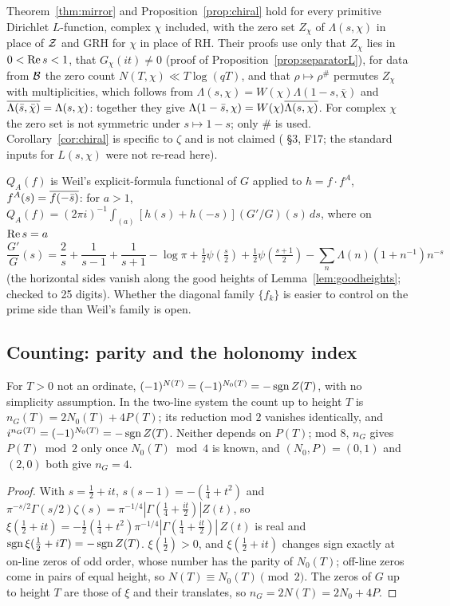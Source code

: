 Theorem~\ref{thm:mirror} and Proposition~\ref{prop:chiral} hold for every primitive Dirichlet $L$-function, complex $\chi$ included, with the zero set $Z_\chi$ of $\Lambda(s,\chi)$ in place of $\mathcal{Z}$ and GRH for $\chi$ in place of RH. Their proofs use only that $Z_\chi$ lies in $0<\operatorname{Re} s<1$, that $G_\chi(it)\ne0$ (proof of Proposition~\ref{prop:separatorL}), for data from $\mathcal{B}$ the zero count $N(T,\chi)\ll T\log(qT)$, and that $\rho\mapsto\rho^\#$ permutes $Z_\chi$ with multiplicities, which follows from $\Lambda(s,\chi)=W(\chi)\Lambda(1-s,\bar\chi)$ and $\overline{\Lambda(\bar s,\bar\chi)}=\Lambda(s,\chi)$: together they give $\Lambda(1-\bar s,\chi)=W(\chi)\overline{\Lambda(s,\chi)}$. For complex $\chi$ the zero set is not symmetric under $s\mapsto1-s$; only $\#$ is used. Corollary~\ref{cor:chiral} is specific to $\zeta$ and is not claimed ( §3, F17; the standard inputs for $L(s,\chi)$ were not re-read here).

$Q_A(f)$ is Weil's explicit-formula functional of $G$ applied to $h=f\cdot f^A$, $f^A(s)=\overline{f(-\bar s)}$: for $a>1$, $Q_A(f)=(2\pi i)^{-1}\int_{(a)}[h(s)+h(-s)](G'/G)(s)\,ds$, where on $\operatorname{Re} s=a$
\[
\frac{G'}{G}(s)=\frac2s+\frac1{s-1}+\frac1{s+1}-\log\pi+\tfrac12\psi(\tfrac s2)+\tfrac12\psi(\tfrac{s+1}2)-\sum_n\Lambda(n)(1+n^{-1})n^{-s}
\]
(the horizontal sides vanish along the good heights of Lemma~\ref{lem:goodheights}; checked to 25 digits). Whether the diagonal family $\{f_k\}$ is easier to control on the prime side than Weil's family is open.

\subsection{Counting: parity and the holonomy index}

\begin{proposition}\label{prop:parity}
For $T>0$ not an ordinate, $(-1)^{N(T)}=(-1)^{N_0(T)}=-\operatorname{sgn} Z(T)$, with no simplicity assumption. In the two-line system the count up to height $T$ is $n_G(T)=2N_0(T)+4P(T)$; its reduction mod $2$ vanishes identically, and $i^{n_G(T)}=(-1)^{N_0(T)}=-\operatorname{sgn} Z(T)$. Neither depends on $P(T)$; mod $8$, $n_G$ gives $P(T)\bmod2$ only once $N_0(T)\bmod4$ is known, and $(N_0,P)=(0,1)$ and $(2,0)$ both give $n_G=4$.
\end{proposition}

\begin{proof}
With $s=\tfrac12+it$, $s(s-1)=-(\tfrac14+t^2)$ and $\pi^{-s/2}\Gamma(s/2)\zeta(s)=\pi^{-1/4}|\Gamma(\tfrac14+\tfrac{it}2)|Z(t)$, so $\xi(\tfrac12+it)=-\tfrac12(\tfrac14+t^2)\pi^{-1/4}|\Gamma(\tfrac14+\tfrac{it}2)|\,Z(t)$ is real and $\operatorname{sgn}\xi(\tfrac12+iT)=-\operatorname{sgn} Z(T)$.
$\xi(\tfrac12)>0$, and $\xi(\tfrac12+it)$ changes sign exactly at on-line zeros of odd order, whose number has the parity of $N_0(T)$; off-line zeros come in pairs of equal height, so $N(T)\equiv N_0(T)\pmod2$.
The zeros of $G$ up to height $T$ are those of $\xi$ and their translates, so $n_G=2N(T)=2N_0+4P$.
\end{proof}

